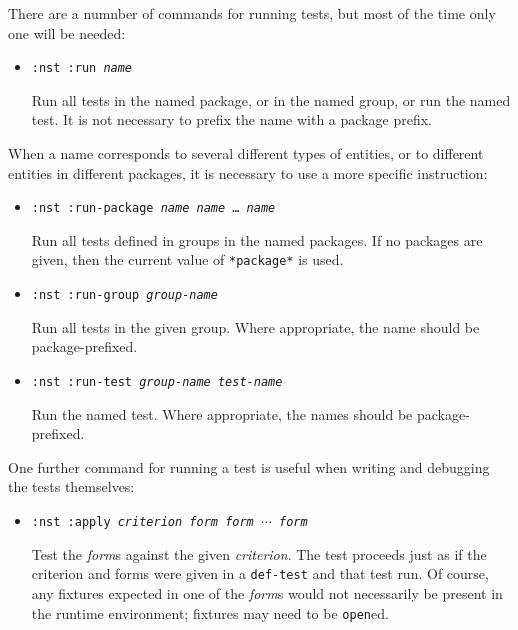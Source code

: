 There are a numnber of commands for running tests, but most of the
time only one will be needed:
\begin{itemize}
\item\texttt{:nst :run {\itshape name}}
  \par Run all tests in the named package, or in the named group, or
  run the named test.  It is not necessary to prefix the name with a
  package prefix.
\end{itemize}
When a name corresponds to several different types of entities, or to
different entities in different packages, it is necessary to use a
more specific instruction:
\begin{itemize}
\item\texttt{:nst :run-package {\itshape name} {\itshape name} \ldots\ {\itshape name}}
  \par Run all tests defined in groups in the named packages.  If no
  packages are given, then the current value of \texttt{*package*} is
  used.
\item\texttt{:nst :run-group {\itshape group-name}}
  \par Run all tests in the given group.  Where appropriate, the name
  should be package-prefixed.
\item\texttt{:nst :run-test {\itshape group-name} {\itshape test-name}}
  \par Run the named test.  Where appropriate, the names should be
  package-prefixed.
\end{itemize}
One further command for running a test is useful when writing and
debugging the tests themselves:
\begin{itemize}
\item\texttt{:nst :apply {\itshape criterion} {\itshape form} {\itshape form} $\cdots$ {\itshape form}}
  \par Test the {\itshape form}s against the given {\itshape
    criterion}.  The test proceeds just as if the criterion and forms
  were given in a \texttt{def-test} and that test run.  Of course, any
  fixtures expected in one of the {\itshape form}s would not
  necessarily be present in the runtime environment; fixtures may need
  to be \texttt{open}ed.
\end{itemize}

